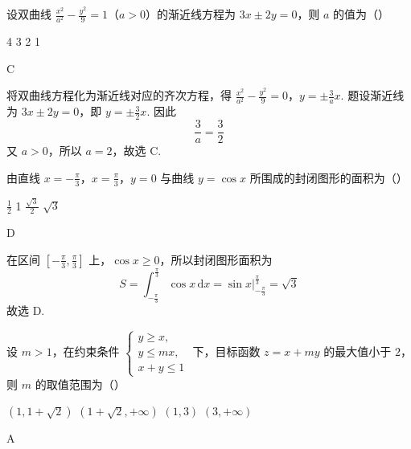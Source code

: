 \begin{problem}
设双曲线 \(\frac{x^2}{a^2} - \frac{y^2}{9} = 1\)（\(a > 0\)）的渐近线方程为 \(3x \pm 2y = 0\)，则 \(a\) 的值为（\quad）

\choices
    {4}
    {3}
    {2}
    {1}
\end{problem}

\begin{answer}
C
\end{answer}

\begin{solution}
将双曲线方程化为渐近线对应的齐次方程，得
\(\frac{x^2}{a^2}-\frac{y^2}{9}=0\)，\(y=\pm\frac{3}{a}x\).
题设渐近线为 \(3x\pm2y=0\)，即 \(y=\pm\frac{3}{2}x\). 因此
\[
\frac{3}{a}=\frac{3}{2}
\]
又 \(a>0\)，所以 \(a=2\)，故选 C.
\end{solution}

\begin{problem}
由直线 \(x = -\frac{\pi}{3}\)，\(x = \frac{\pi}{3}\)，\(y = 0\) 与曲线 \(y = \cos x\) 所围成的封闭图形的面积为（\quad）

\choices
    {\(\frac{1}{2}\)}
    {1}
    {\(\frac{\sqrt{3}}{2}\)}
    {\(\sqrt{3}\)}
\end{problem}

\begin{answer}
D
\end{answer}

\begin{solution}
在区间 \(\left[-\frac{\pi}{3},\frac{\pi}{3}\right]\) 上，\(\cos x\geqslant0\)，所以封闭图形面积为
\[
S=\int_{-\frac{\pi}{3}}^{\frac{\pi}{3}}\cos x\,\mathrm{d}x
=\left.\sin x\right|_{-\frac{\pi}{3}}^{\frac{\pi}{3}}
=\sqrt3
\]
故选 D.
\end{solution}

\begin{problem}
设 \(m > 1\)，在约束条件 \(\begin{cases}
y \geqslant x,\\
y \leqslant mx,\\
x + y \leqslant 1
\end{cases}\) 下，目标函数 \(z = x + my\) 的最大值小于 \(2\)，则 \(m\) 的取值范围为（\quad）

\choices
    {\((1, 1 + \sqrt{2})\)}
    {\((1 + \sqrt{2}, +\infty)\)}
    {\((1,3)\)}
    {\((3, +\infty)\)}
\end{problem}

\begin{answer}
A
\end{answer}

